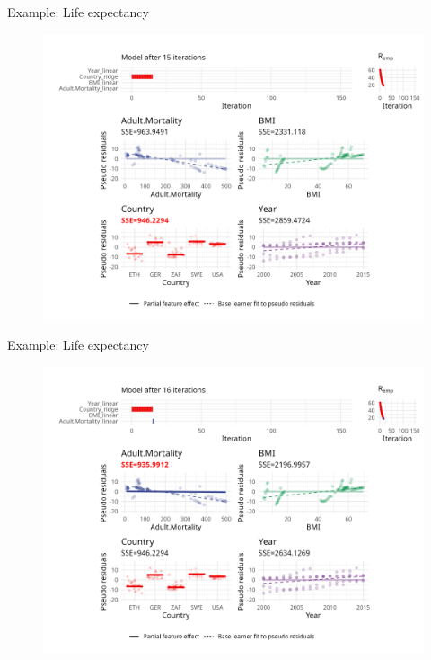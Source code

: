 \begin{frame}{Example: Life expectancy}
	\begin{figure}
		\centering
		\includegraphics[width=\textwidth]{figure/cwb-anim/fig-iter-0015.png}
	\end{figure}
	\addtocounter{framenumber}{-1}
\end{frame}


\begin{frame}{Example: Life expectancy}
	\begin{figure}
		\centering
		\includegraphics[width=\textwidth]{figure/cwb-anim/fig-iter-0016.png}
	\end{figure}
	\addtocounter{framenumber}{-1}
\end{frame}


